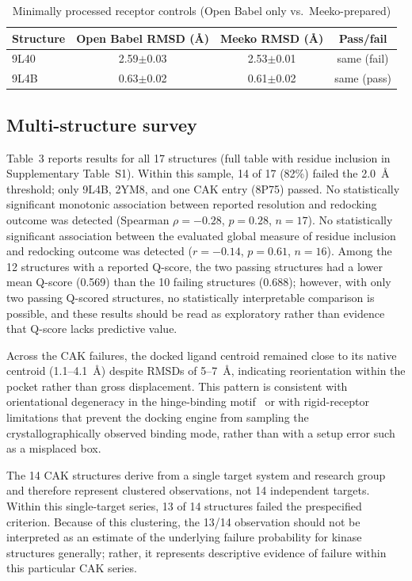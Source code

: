 \documentclass[global,twocolumn]{svjour}
\newcommand{\st}{\footnotesize\setlength{\tabcolsep}{3pt}}
\begin{document}
\begin{table}[t]
\centering
\caption{Minimally processed receptor controls (Open Babel only vs.\
Meeko-prepared)}
\label{tab:receptorcontrols}
\st
\begin{tabular}{lccc}
\toprule
Structure & Open Babel RMSD (\AA{}) & Meeko RMSD (\AA{}) & Pass/fail \\
\midrule
9L40 & 2.59$\pm$0.03 & 2.53$\pm$0.01 & same (fail) \\
9L4B & 0.63$\pm$0.02 & 0.61$\pm$0.02 & same (pass) \\
\bottomrule
\end{tabular}
\end{table}

\subsection{Multi-structure survey}

Table~3 reports results for all 17 structures (full table with residue
inclusion in Supplementary Table~S1). Within this sample, 14 of 17 (82\%)
failed the 2.0~\AA{} threshold; only 9L4B, 2YM8, and one CAK entry (8P75)
passed. No statistically significant monotonic association between reported
resolution and redocking outcome was detected (Spearman $\rho=-0.28$,
$p=0.28$, $n=17$). No statistically significant association between the
evaluated global measure of residue inclusion and redocking outcome was
detected ($r=-0.14$, $p=0.61$, $n=16$). Among the 12 structures with a
reported Q-score, the two passing structures had a lower mean Q-score (0.569)
than the 10 failing structures (0.688); however, with only two passing
Q-scored structures, no statistically interpretable comparison is possible,
and these results should be read as exploratory rather than evidence that
Q-score lacks predictive value.

Across the CAK failures, the docked ligand centroid remained close to its
native centroid (1.1--4.1~\AA{}) despite RMSDs of 5--7~\AA{}, indicating
reorientation within the pocket rather than gross displacement. This pattern
is consistent with orientational degeneracy in the hinge-binding
motif~\cite{xing2020} or with rigid-receptor limitations that prevent the
docking engine from sampling the crystallographically observed binding mode,
rather than with a setup error such as a misplaced box.

The 14 CAK structures derive from a single target system and research group
and therefore represent clustered observations, not 14 independent targets.
Within this single-target series, 13 of 14 structures failed the
prespecified criterion. Because of this clustering, the 13/14 observation
should not be interpreted as an estimate of the underlying failure
probability for kinase structures generally; rather, it represents
descriptive evidence of failure within this particular CAK series.
\end{document}
